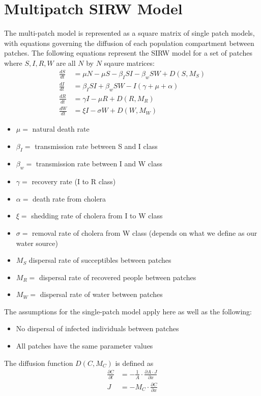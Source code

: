 \documentclass[12pt]{article}\usepackage[]{graphicx}\usepackage[]{color}
\begin{document}
\section{Multipatch SIRW Model}

The multi-patch model is represented as a square matrix of single patch models, with equations governing the diffusion of each population compartment between patches.
The following equations represent the SIRW model for a set of patches where $S,I,R,W$ are all $N$ by $N$ sqaure matrices:
\begin{align*}
    \frac{dS}{dt}&= \mu N - \mu S - \beta_I S I - \beta_w S W + D(S,M_S)\\
    \frac{dI}{dt}&= \beta_I S I + \beta_w S W - I(\gamma + \mu + \alpha)\\
    \frac{dR}{dt}&= \gamma I - \mu R  + D(R,M_R) \\
    \frac{dW}{dt}&= \xi I - \sigma W + D(W,M_W)
\end{align*}
\begin{itemize}
    \item$\mu=$ natural death rate
    \item$\beta_I=$ transmission rate between S and I class
    \item$\beta_w=$ transmission rate between I and W class
    \item$\gamma=$ recovery rate (I to R class)
    \item$\alpha=$ death rate from cholera
    \item$\xi=$ shedding rate of cholera from I to W class
    \item$\sigma=$	removal rate of cholera from W class (depends on what we define as our water source)
    \item$M_S$ dispersal rate of succeptibles between patches
    \item$M_R=$ dispersal rate of recovered people between patches
    \item$M_W=$ dispersal rate of water between patches
\end{itemize}
The assumptions for the single-patch model apply here as well as the following:
\begin{itemize}
    \item No dispersal of infected individuals between patches
    \item All patches have the same parameter values
\end{itemize}
The diffusion function $D(C,M_C)$ is defined as
\begin{align*}
    \frac{\partial C}{\partial t} &= -\frac{1}{A} \cdot \frac{\partial A \cdot J}{\partial x}\\
    J &= - M_C \cdot \frac{\partial C}{\partial x}
\end{align*}
\end{document}
